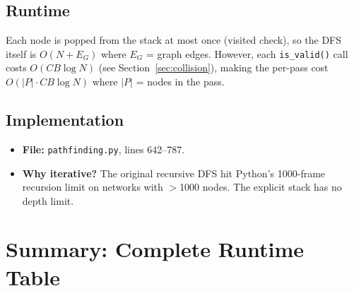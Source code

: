 \documentclass[11pt,a4paper]{article}
\newcommand{\Oh}[1]{$O(#1)$}
\newcommand{\filename}[1]{\texttt{\textcolor{accentblue}{#1}}}
\newcommand{\funcname}[1]{\texttt{\textcolor{codepurple}{#1}}}
\begin{document}
\subsection{Runtime}

Each node is popped from the stack at most once (visited check), so the DFS itself is \Oh{N + E_G} where $E_G$ = graph edges. However, each \funcname{is\_valid()} call costs \Oh{CB\log N} (see Section~\ref{sec:collision}), making the per-pass cost \Oh{|P| \cdot CB\log N} where $|P|$ = nodes in the pass.

\subsection{Implementation}

\begin{itemize}[nosep]
    \item \textbf{File:} \filename{pathfinding.py}, lines 642--787.
    \item \textbf{Why iterative?} The original recursive DFS hit Python's 1000-frame recursion limit on networks with $>$1000 nodes. The explicit stack has no depth limit.
\end{itemize}


\section{Summary: Complete Runtime Table}
\label{sec:summary}
\end{document}

